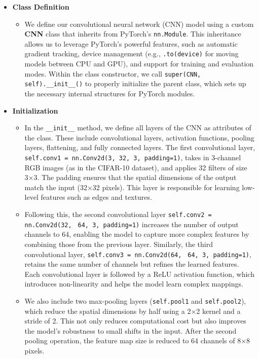 \documentclass[a4paper,12pt]{article}
\begin{document}
\begin{itemize}
    \item \textbf{Class Definition}
    \begin{itemize}
        \item We define our convolutional neural network (CNN) model using a custom \textbf{CNN} class that inherits from PyTorch’s \verb|nn.Module|. This inheritance allows us to leverage PyTorch’s powerful features, such as automatic gradient tracking, device management (e.g., \verb|.to(device)| for moving models between CPU and GPU), and support for training and evaluation modes. Within the class constructor, we call \verb|super(CNN,| \verb|self).__init__()| to properly initialize the parent class, which sets up the necessary internal structures for PyTorch modules.
    \end{itemize}

    \item \textbf{Initialization}
    \begin{itemize}
        \item In the \verb|__init__| method, we define all layers of the CNN as attributes of the class. These include convolutional layers, activation functions, pooling layers, flattening, and fully connected layers. The first convolutional layer, \verb|self.conv1 = nn.Conv2d(3, 32, 3, padding=1)|, takes in 3-channel RGB images (as in the CIFAR-10 dataset), and applies 32 filters of size 3×3. The padding ensures that the spatial dimensions of the output match the input (32×32 pixels). This layer is responsible for learning low-level features such as edges and textures.

        \item Following this, the second convolutional layer \verb|self.conv2 = nn.Conv2d(32,| \verb| 64, 3, padding=1)| increases the number of output channels to 64, enabling the model to capture more complex features by combining those from the previous layer. Similarly, the third convolutional layer, \verb|self.conv3 = nn.Conv2d(64,| \verb| 64, 3, padding=1)|, retains the same number of channels but refines the learned features. Each convolutional layer is followed by a ReLU activation function, which introduces non-linearity and helps the model learn complex mappings.
        
        \item We also include two max-pooling layers (\verb|self.pool1| and \verb|self.pool2|), which reduce the spatial dimensions by half using a 2×2 kernel and a stride of 2. This not only reduces computational cost but also improves the model’s robustness to small shifts in the input. After the second pooling operation, the feature map size is reduced to 64 channels of 8×8 pixels.
        

\end{itemize}
\end{itemize}
\end{document}
